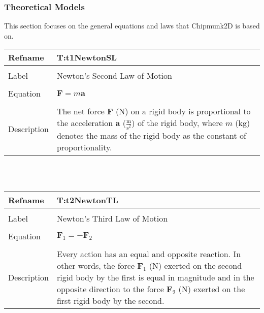 \documentclass[12pt]{article}
\begin{document}
\subsubsection{Theoretical Models}
\label{Sec:TheoMode}
This section focuses on the general equations and laws that Chipmunk2D is based on.
~\newline
\noindent \begin{minipage}{\textwidth}
\begin{tabular}{p{} p{}}
\toprule \textbf{Refname} & \textbf{T:t1NewtonSL}
\label{T:t1NewtonSL}
\\ \midrule \\
Label & Newton's Second Law of Motion
\\ \midrule \\
Equation & $\mathbf{F}=m \mathbf{a}$
\\ \midrule \\
Description & The net force $\mathbf{F}$ (N) on a rigid body is proportional to the acceleration $\mathbf{a}$ ($\frac{\text{m}}{\text{s}^{2}}$) of the rigid body, where $m$ (kg) denotes the mass of the rigid body as the constant of proportionality.
\\ \bottomrule \end{tabular}
\end{minipage}\\
~\newline
\noindent \begin{minipage}{\textwidth}
\begin{tabular}{p{} p{}}
\toprule \textbf{Refname} & \textbf{T:t2NewtonTL}
\label{T:t2NewtonTL}
\\ \midrule \\
Label & Newton's Third Law of Motion
\\ \midrule \\
Equation & ${\mathbf{F}_{1}}=-{\mathbf{F}_{2}}$
\\ \midrule \\
Description & Every action has an equal and opposite reaction. In other words, the force ${\mathbf{F}_{1}}$ (N) exerted on the second rigid body by the first is equal in magnitude and in the opposite direction to the force ${\mathbf{F}_{2}}$ (N) exerted on the first rigid body by the second.
\\ \bottomrule \end{tabular}
\end{minipage}\\
\end{document}
